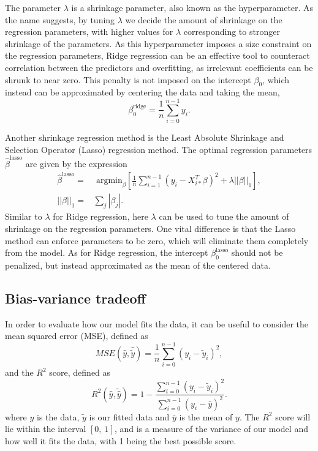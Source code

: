 \documentclass[a4paper, 10pt]{article}
\begin{document}
\begin{multicols}{2}
The parameter $\lambda$ is a shrinkage parameter, also known as the hyperparameter. As the name suggests, by tuning $\lambda$ we decide the amount of shrinkage on the regression parameters, with higher values for $\lambda$ corresponding to stronger shrinkage of the parameters. As this hyperparameter imposes a size constraint on the regression parameters, Ridge regression can be an effective tool to counteract correlation between the predictors and overfitting, as irrelevant coefficients can be shrunk to near zero. This penalty is not imposed on the intercept $\beta_0$, which instead can be approximated by centering the data and taking the mean,
\begin{equation}
	\beta_0^\text{ridge}=\frac{1}{n}\sum_{i=0}^{n-1}y_i.
	\label{eq:beta0_Ridge}
\end{equation}

Another shrinkage regression method is the  Least Absolute Shrinkage and Selection Operator (Lasso) regression method. The optimal regression parameters $\hat{\beta}^\text{lasso}$ are  given by the expression
\begin{align}
    \hat{\beta}^\text{lasso} =&  \text{ argmin}_\beta \left[  \frac{1}{n}\sum_{i=1}^{n-1}(y_i-X_{i*}^T\beta)^2 + \lambda ||\beta||_1  \right],
    \label{eq:argminbeta_lasso}\\
    ||\beta||_1 =& \sum_j |\beta_j|.
\end{align}
Similar to $\lambda$ for Ridge regression, here $\lambda$ can be used to tune the amount of shrinkage on the regression parameters. One vital difference is that the Lasso method can enforce parameters to be zero, which will eliminate them completely from the model.  As for Ridge regression, the intercept $\beta_0^\text{lasso}$ should not be penalized, but instead approximated as the mean of the centered data.

\subsection{Bias-variance tradeoff}
In order to evaluate how our model fits the data, it can be useful to consider the mean squared error (MSE), defined as
\begin{equation}
    MSE(\hat{y},\hat{\tilde{y}}) = \frac{1}{n}
    \sum_{i=0}^{n-1}(y_i-\tilde{y}_i)^2,
    \label{eq:MSE}
\end{equation}
and the $R^2$ score, defined as
\begin{equation}
    R^2(\hat{y}, \tilde{\hat{y}}) = 1 - \frac{\sum_{i=0}^{n - 1} (y_i - \tilde{y}_i)^2}{\sum_{i=0}^{n - 1} (y_i - \bar{y})^2}.
    \label{eq:R2}
\end{equation}
where $y$ is the data, $\tilde{y}$ is our fitted data and $\bar{y}$ is the mean of $y$.  The $R^2$ score will lie within the interval $[0,\ 1]$, and is a measure of the variance of our model and how well it fits the data, with 1 being the best possible score.


\end{multicols}
\end{document}
